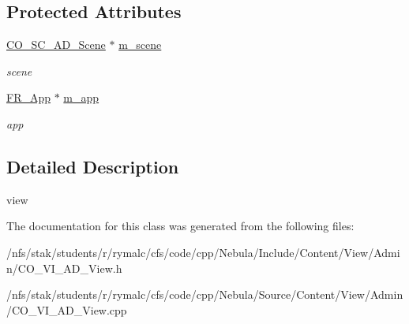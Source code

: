 \subsection*{Protected Attributes}
\begin{DoxyCompactItemize}
\item 
\hypertarget{classContent_1_1View_1_1Admin_1_1View_a8e252b5e5dfcb744cc39790f40116126}{
\hyperlink{classContent_1_1CO__SC__AD__Scene}{CO\_\-SC\_\-AD\_\-Scene} $\ast$ \hyperlink{classContent_1_1View_1_1Admin_1_1View_a8e252b5e5dfcb744cc39790f40116126}{m\_\-scene}}
\label{classContent_1_1View_1_1Admin_1_1View_a8e252b5e5dfcb744cc39790f40116126}

\begin{DoxyCompactList}\small\item\em scene \item\end{DoxyCompactList}\item 
\hypertarget{classContent_1_1View_1_1Admin_1_1View_a223a0c62a2c960d56e8aa18dbfb33e93}{
\hyperlink{classFramework_1_1App}{FR\_\-App} $\ast$ \hyperlink{classContent_1_1View_1_1Admin_1_1View_a223a0c62a2c960d56e8aa18dbfb33e93}{m\_\-app}}
\label{classContent_1_1View_1_1Admin_1_1View_a223a0c62a2c960d56e8aa18dbfb33e93}

\begin{DoxyCompactList}\small\item\em app \item\end{DoxyCompactList}\end{DoxyCompactItemize}


\subsection{Detailed Description}
view 

The documentation for this class was generated from the following files:\begin{DoxyCompactItemize}
\item 
/nfs/stak/students/r/rymalc/cfs/code/cpp/Nebula/Include/Content/View/Admin/CO\_\-VI\_\-AD\_\-View.h\item 
/nfs/stak/students/r/rymalc/cfs/code/cpp/Nebula/Source/Content/View/Admin/CO\_\-VI\_\-AD\_\-View.cpp\end{DoxyCompactItemize}
